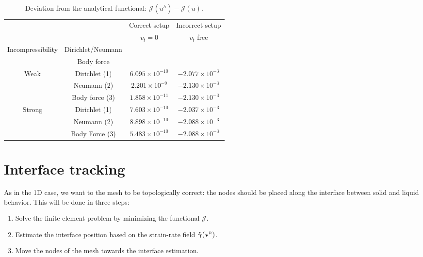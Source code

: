 \documentclass[11 pt]{report}
\begin{document}
\begin{table}[h]
    \centering
    \begin{tabular}[t]{cccc}
        \toprule
         & & Correct setup & Incorrect setup\\
         & & $v_t=0$ & $v_t$ free\\
        Incompressibility & Dirichlet/Neumann & & \\
         & Body force & & \\
        \midrule
        \multirow{2}{*}{Weak} & Dirichlet (1) & $6.095 \times 10^{-10}$ &  $-2.077 \times 10^{-3}$\\
         & Neumann (2) & $2.201 \times 10^{-9}$ &  $-2.130 \times 10^{-3}$\\
         & Body force (3) & $1.858 \times 10^{-11}$ & $-2.130 \times 10^{-3}$\\[4pt]
        \multirow{2}{*}{Strong} & Dirichlet (1) & $7.603 \times 10^{-10}$ &  $-2.037 \times 10^{-3}$\\
         & Neumann (2) & $8.898 \times 10^{-10}$ &  $-2.088 \times 10^{-3}$\\
         & Body Force (3) & $5.483 \times 10^{-10}$ & $-2.088 \times 10^{-3}$\\
        \bottomrule
    \end{tabular}
    \caption{Deviation from the analytical functional: $\mathcal{J}(u^h) - \mathcal{J}(u)$.}
    \label{tab:setups_compare}
\end{table}%

\section{Interface tracking}
As in the 1D case, we want to the mesh to be topologically correct: the nodes should be placed along the interface between solid and liquid behavior. This will be done in three steps:
\begin{enumerate}
    \item Solve the finite element problem by minimizing the functional $\mathcal{J}$.
    \item Estimate the interface position based on the strain-rate field $\boldsymbol{\dot \gamma}(\mathbf{v}^h)$.
    \item Move the nodes of the mesh towards the interface estimation.
\end{enumerate}
\end{document}
